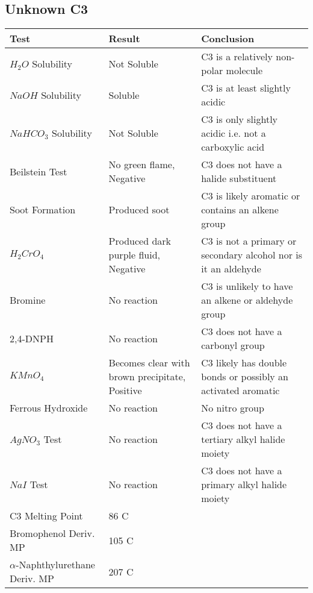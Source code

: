 \documentclass[11pt]{article}
\begin{document}
	\subsection{Unknown C3}
	\begin{table}[h]
		\raggedright
		\begin{tabular}{ l  p{3.0cm} p{5.4cm} } 
			\toprule
			\textbf{Test} & \textbf{Result} & \textbf{Conclusion} \\\midrule
			
			$H_2O$ Solubility & Not Soluble & C3 is a relatively non-polar molecule \\\hline
			
			$NaOH$ Solubility & Soluble & C3 is at least slightly acidic \\\hline
			
			$NaHCO_3$ Solubility & Not Soluble & C3 is only slightly acidic i.e. not a carboxylic acid\\\hline
			
			Beilstein Test & No green flame, Negative & C3 does not have a halide substituent \\\hline
			
			Soot Formation & Produced soot & C3 is likely aromatic or contains an alkene group \\\hline
			
			$H_2CrO_4$ & Produced dark purple fluid, Negative & C3 is not a primary or secondary alcohol nor is it an aldehyde \\\hline
			
			Bromine & No reaction & C3 is unlikely to have an alkene or aldehyde group \\\hline 
			
			2,4-DNPH & No reaction & C3 does not have a carbonyl group \\\hline 
			
			$KMnO_4$ & Becomes clear with brown precipitate, Positive & C3 likely has double bonds or possibly an activated aromatic \\\hline  
			
			Ferrous Hydroxide & No reaction & No nitro group \\\hline
			
			$AgNO_3$ Test & No reaction & C3 does not have a tertiary alkyl halide moiety \\\hline 
			
			$NaI$ Test & No reaction & C3 does not have a primary alkyl halide moiety \\\hline 
			
			C3 Melting Point & 86 C &  \\\hline
			
			Bromophenol Deriv. MP & 105 C &  \\\hline
			
			$\alpha$-Naphthylurethane Deriv. MP & 207 C &  \\\hline
			
		\end{tabular}
	\end{table}
	\pagebreak
\end{document}
